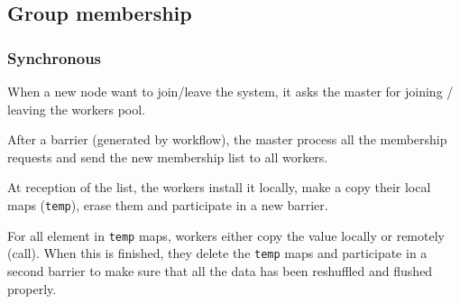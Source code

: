 \documentclass[10pt]{article}
\begin{document}
\subsection{Group membership}
\subsubsection*{Synchronous}
When a new node want to join/leave the system, it asks the master for joining / leaving the workers pool.\ol
\item After a barrier (generated by workflow), the master process all the membership requests and send the new membership list to all workers.
\item At reception of the list, the workers install it locally, make a copy their local maps ({\tt temp}), erase them and participate in a new barrier.
\item For all element in {\tt temp} maps, workers either copy the value locally or remotely (call). When this is finished, they delete the {\tt temp} maps and participate in a second barrier to make sure that all the data has been reshuffled and flushed properly.
\ole
\end{document}
